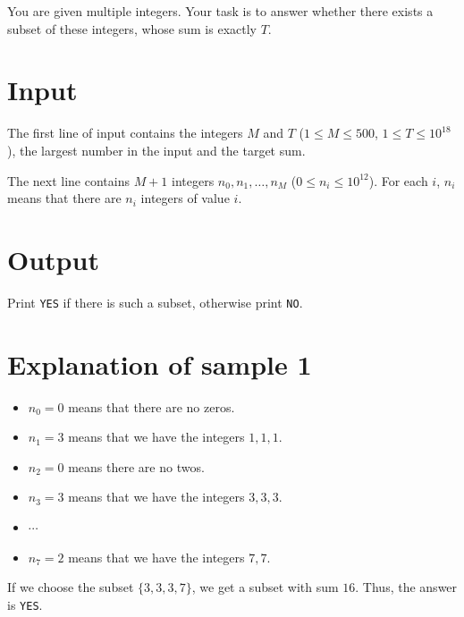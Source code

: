 You are given multiple integers. Your task is to answer whether there exists a subset of these integers, whose
sum is exactly $T$.

\section*{Input}
The first line of input contains the integers $M$ and $T$ ($1 \leq M \leq 500$, $1 \leq T \leq 10^{18}$),
the largest number in the input and the target sum.

The next line contains $M+1$ integers $n_0, n_1, \dots, n_M$ ($0 \leq n_i \leq 10^{12}$). For each $i$,
$n_i$ means that there are $n_i$ integers of value $i$.

\section*{Output}
Print \texttt{YES} if there is such a subset, otherwise print \texttt{NO}.

\section*{Explanation of sample 1}
\begin{itemize}
  \item $n_0=0$ means that there are no zeros.
  \item $n_1=3$ means that we have the integers $1, 1, 1$.
  \item $n_2=0$ means there are no twos.
  \item $n_3=3$ means that we have the integers $3,3,3$.
  \item $\cdots$
  \item $n_7=2$ means that we have the integers $7,7$.
\end{itemize}

If we choose the subset $\{3,3,3,7\}$, we get a subset with sum $16$. Thus, the answer is \texttt{YES}.
